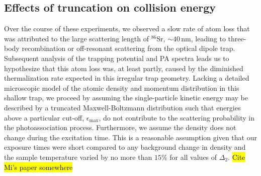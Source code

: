 \subsection{Effects of truncation on collision energy} \label{sec:trunc_trap}
Over the course of these experiments, we observed a slow rate of atom loss that was attributed to the large scattering length of $^{86}$Sr, $\sim40$\,nm, leading to three-body recombination or off-resonant scattering from the optical dipole trap.
Subsequent analysis of the trapping potential and PA spectra leads us to hypothesize that this atom loss was, at least partly, caused by the diminished thermalization rate expected in this irregular trap geometry.
Lacking a detailed microscopic model of the atomic density and momentum distribution in this shallow trap, we proceed by assuming the single-particle kinetic energy may be described by a truncated Maxwell-Boltzmann distribution such that energies above a particular cut-off, $\epsilon_\text{max}$, do not contribute to the scattering probability in the photoassociation process.
Furthermore, we assume the density does not change during the excitation time.
This is a reasonable assumption given that our exposure times were short compared to any background change in density and the sample temperature varied by no more than $15$\% for all values of $\Delta_2$.
\hl{Cite Mi's paper somewhere}


